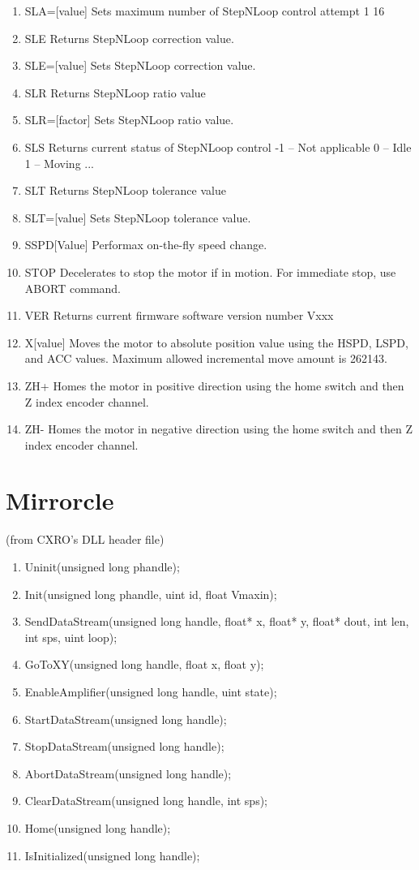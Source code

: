 \documentclass[10pt,letter,twoside]{report}
\begin{document}
\begin{itemize}
\begin{enumerate}
\item SLA=[value]	Sets maximum number of StepNLoop control attempt		1	16
\item SLE	Returns StepNLoop correction value.			
\item SLE=[value]	Sets StepNLoop correction value.			
\item SLR	Returns StepNLoop ratio value			
\item SLR=[factor]	Sets StepNLoop ratio value.  			
\item SLS	Returns current status of StepNLoop control	-1 – Not applicable  0 – Idle  1 – Moving ...
\item SLT	Returns StepNLoop tolerance value			
\item SLT=[value]	Sets StepNLoop tolerance value.  			
\item SSPD[Value]	Performax on-the-fly speed change.  
\item STOP	Decelerates to stop the motor if in motion.  For immediate stop, use ABORT command.			
\item VER	Returns current firmware software version number	Vxxx		
\item X[value]	Moves the motor to absolute position value using the HSPD, LSPD, and ACC values. Maximum allowed incremental move amount is 262143. 
\item ZH+	Homes the motor in positive direction using the home switch and then Z index encoder channel.			
\item ZH-	Homes the motor in negative direction using the home switch and then Z index encoder channel.			
\end{enumerate}
\end{itemize}


\section{Mirrorcle}
(from CXRO's DLL header file)
\begin{enumerate}
\item Uninit(unsigned long phandle);
\item Init(unsigned long phandle, uint id, float Vmaxin);
\item SendDataStream(unsigned long handle, float* x, float* y, float* dout, int len, int sps, uint loop);
\item GoToXY(unsigned long handle, float x, float y);
\item EnableAmplifier(unsigned long handle, uint state);
\item StartDataStream(unsigned long handle);
\item StopDataStream(unsigned long handle);
\item AbortDataStream(unsigned long handle);
\item ClearDataStream(unsigned long handle, int sps);
\item Home(unsigned long handle);
\item IsInitialized(unsigned long handle);
\end{enumerate}
\end{document}
